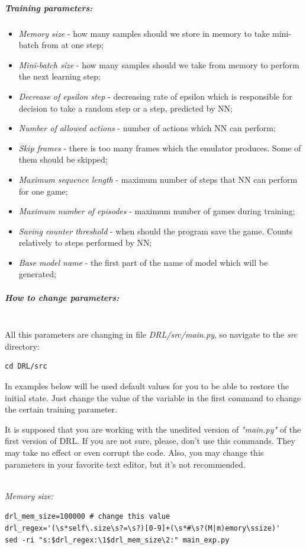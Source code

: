 \documentclass[a4paper,oneside,dvipsnames]{article}
\begin{document}
\subparagraph*{Training parameters:}
\begin{itemize}
\item \textit{Memory size} - how many samples should we store in memory to take mini-batch from at one step;
\item \textit{Mini-batch size} - how many samples should we take from memory to perform the next learning step;
\item \textit{Decrease of epsilon step} - decreasing rate of epsilon which is responsible for decision to take a random step or a step, predicted by NN;
\item \textit{Number of allowed actions} - number of actions which NN can perform;
\item \textit{Skip frames} - there is too many frames which the emulator produces. Some of them should be skipped;
\item \textit{Maximum sequence length} - maximum number of steps that NN can perform for one game;
\item \textit{Maximum number of episodes} - maximum number of games during training;
\item \textit{Saving counter threshold} - when should the program save the game. Counts relatively to steps performed by NN;
\item \textit{Base model name} - the first part of the name of model which will be generated;
\end{itemize}

\subparagraph*{How to change parameters:}\mbox{}\\
All this parameters are changing in file \textit{DRL/src/main.py}, so navigate to the \textit{src} directory:
\begin{verbatim}
cd DRL/src
\end{verbatim}

In examples below will be used default values for you to be able to restore the initial state. Just change the value of the variable in the first command to change the certain training parameter.
\begin{tcolorbox}[colbacktitle=red!40!white, coltitle=black, width=\linewidth, fonttitle=\bfseries, title=WARNING]
It is supposed that you are working with the unedited version of \textit{"main.py"} of the first version of DRL. If you are not sure, please, don't use this commands. They may take no effect or even corrupt the code. Also, you may change this parameters in your favorite text editor, but it's not recommended. 
\mbox{}\\
\end{tcolorbox}
\mbox{}\\
\textit{Memory size:}
\begin{tcolorbox}[width=\linewidth]
\verb!drl_mem_size=100000 # change this value! \\
\verb!drl_regex='(\s*self\.size\s?=\s?)[0-9]+(\s*#\s?(M|m)emory\ssize)'! \\
\verb!sed -ri "s:$drl_regex:\1$drl_mem_size\2:" main_exp.py!
\end{tcolorbox}
\end{document}
